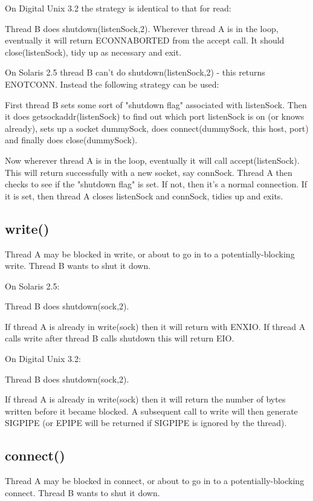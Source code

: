 \documentclass[11pt,twoside,onecolumn]{article}
\begin{document}
On Digital Unix 3.2 the strategy is identical to that for read:

Thread B does shutdown(listenSock,2).  Wherever thread A is in the loop,
eventually it will return ECONNABORTED from the accept call.  It should
close(listenSock), tidy up as necessary and exit.

On Solaris 2.5 thread B can't do shutdown(listenSock,2) - this returns
ENOTCONN.  Instead the following strategy can be used:

First thread B sets some sort of "shutdown flag" associated with listenSock.
Then it does getsockaddr(listenSock) to find out which port listenSock is on
(or knows already), sets up a socket dummySock, does connect(dummySock, this
host, port) and finally does close(dummySock).

Now wherever thread A is in the loop, eventually it will call
accept(listenSock).  This will return successfully with a new socket, say
connSock.  Thread A then checks to see if the "shutdown flag" is set.  If not,
then it's a normal connection.  If it is set, then thread A closes listenSock
and connSock, tidies up and exits.


\subsection{write()}

Thread A may be blocked in write, or about to go in to a potentially-blocking
write.  Thread B wants to shut it down.

On Solaris 2.5:

Thread B does shutdown(sock,2).

If thread A is already in write(sock) then it will return with ENXIO.  If
thread A calls write after thread B calls shutdown this will return EIO.


On Digital Unix 3.2:

Thread B does shutdown(sock,2).

If thread A is already in write(sock) then it will return the number of bytes
written before it became blocked.  A subsequent call to write will then
generate SIGPIPE (or EPIPE will be returned if SIGPIPE is ignored by the
thread).


\subsection{connect()}

Thread A may be blocked in connect, or about to go in to a potentially-blocking
connect.  Thread B wants to shut it down.
\end{document}
